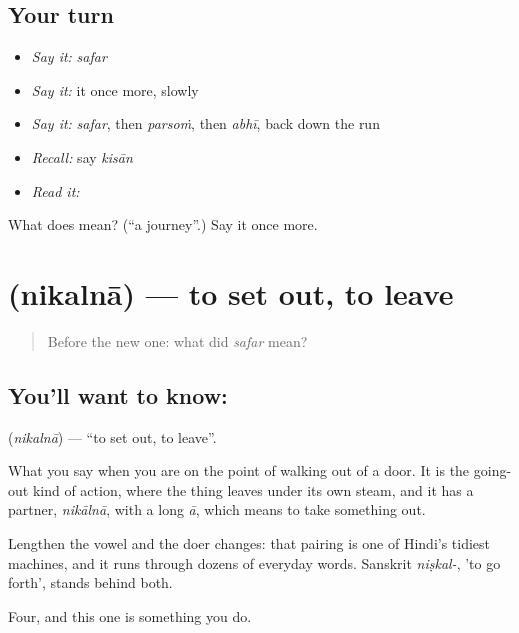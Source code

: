 \subsection*{Your turn}
\begin{itemize}
\raggedright
  \item \emph{Say it:} \emph{safar}
  \item \emph{Say it:} it once more, slowly
  \item \emph{Say it:} \emph{safar}, then \emph{parsoṁ}, then \emph{abhī}, back down the run
  \item \emph{Recall:} say \emph{kisān}
  \item \emph{Read it:} \textbf{}
\end{itemize}

\begin{tcolorbox}[breakable,colback=teal!4,colframe=teal!35!black,title={Before you move on}]
What does  mean? (\textquotedblleft{}a journey\textquotedblright{}.) Say it once more.
\end{tcolorbox}
\section[\texorpdfstring{\hi{निकलना} (nikalnā)}{निकलना (nikalnā)}]{ (nikalnā) — to set out, to leave}

\label{lesson:HI-C49-set-out}



\begin{quote}
Before the new one: what did \emph{safar} mean?
\end{quote}

\subsection*{You'll want to know: }
\textbf{} (\emph{nikalnā}) — \textquotedblleft{}to set out, to leave\textquotedblright{}.

What you say when you are on the point of walking out of a door. It is the going-out kind of action, where the thing leaves under its own steam, and it has a partner, \emph{nikālnā}, with a long \emph{ā}, which means to take something out.

Lengthen the vowel and the doer changes: that pairing is one of Hindi's tidiest machines, and it runs through dozens of everyday words. Sanskrit \emph{niṣkal-}, 'to go forth', stands behind both.

\begin{grammarlens}[title={What you've built}]
Four, and this one is something you do.
\end{grammarlens}


